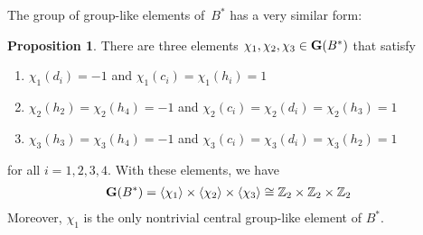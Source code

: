 \documentclass{article}
\newcounter{num}
\newcounter{num1}
\numberwithin{equation}{section}
\theoremstyle{definition}
\newtheorem*{prop}{Proposition}
\theoremstyle{break}
\newcommand{\1}{{(1)}}
\newcommand{\2}{{(2)}}
\newcommand{\3}{{(3)}}
\newcommand{\Z}{{\mathbb Z}}
\begin{document}
The group of group-like elements of~$B^*$ has a very similar form:
\begin{prop} \label{GrouplB*}
There are three elements $\chi_1, \chi_2, \chi_3 \in {\bf G}(B^*)$ that satisfy
\begin{enumerate}
\item
$\chi_1(d_i) = -1$ and $\chi_1(c_i) = \chi_1(h_i) = 1$

\item
$\chi_2 (h_2) = \chi_2 (h_4)=-1 $ and $\chi_2 (c_i) = \chi_2(d_i) = \chi_2(h_3) =1$

\item
$\chi_3(h_3) = \chi_3(h_4) = -1$ and $\chi_3(c_i) = \chi_3(d_i) = \chi_3(h_2) =1$
\end{enumerate}
for all $i = 1, 2, 3, 4$. With these elements, we have
\begin{align*}
{\bf G}(B^*) &= \left\langle \chi_1 \right\rangle \times\left\langle\chi_2 \right\rangle \times \left\langle \chi_3 \right\rangle\cong \Z_2 \times \Z_2\times \Z_2
\end{align*}
Moreover, $\chi_1$ is the only nontrivial central group-like element of $B^*$.
\end{prop}
\end{document}
